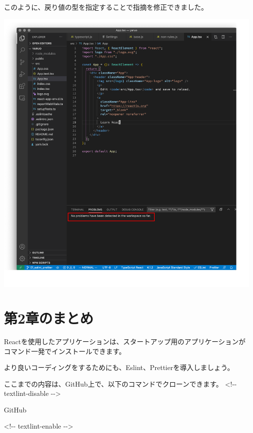 このように、戻り値の型を指定することで指摘を修正できました。

\begin{reviewimage}[H]%
\includegraphics[width=1.0\maxwidth]{./images/02-create-react-app/06_eslint_prettier_fixdoneAll.png}%
\label{image:02-create-react-app:06_eslint_prettier_fixdoneAll}
\end{reviewimage}

\section{第2章のまとめ}
\keeplastskip{
  \label{sec:2-6}
  \label{sec-chap02review}
  \par\nobreak
}

Reactを使用したアプリケーションは、スタートアップ用のアプリケーションがコマンド一発でインストールできます。

より良いコーディングをするためにも、Eslint、Prettierを導入しましょう。

\begin{starternote}[]{}

ここまでの内容は、GitHub上で、以下のコマンドでクローンできます。
\textless{}!{-}{-} textlint{-}disable {-}{-}\textgreater{}

\def\startercodeblockfontsize{}
\begin{starterterminal}[]{GitHub}\end{starterterminal}

\textless{}!{-}{-} textlint{-}enable {-}{-}\textgreater{}

\end{starternote}
